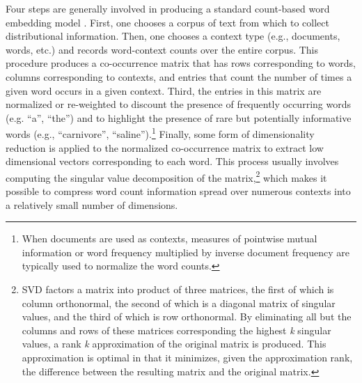 Four steps are generally involved in producing a standard count-based word embedding model \citep{TurneyPantel:2010,LandauerDumais:1997,Baroni:2014}. First, one chooses a corpus of text from which to collect distributional information. Then, one chooses a context type (e.g., documents, words, etc.) and records word-context counts over the entire corpus. This procedure produces a co-occurrence matrix that has rows corresponding to words, columns corresponding to contexts, and entries that count the number of times a given word occurs in a given context. Third, the entries in this matrix are normalized or re-weighted to discount the presence of frequently occurring words (e.g. ``a'', ``the'') and to highlight the presence of rare but potentially informative words (e.g., ``carnivore'', ``saline'').\footnote{When documents are used as contexts, measures of pointwise mutual information or word frequency multiplied by inverse document frequency are typically used to normalize the word counts.} Finally, some form of dimensionality reduction is applied to the normalized co-occurrence matrix to extract low dimensional vectors corresponding to each word. This process usually involves computing the singular value decomposition of the matrix,\footnote{SVD factors a matrix into product of three matrices, the first of which is column orthonormal, the second of which is a diagonal matrix of singular values, and the third of which is row orthonormal. By eliminating all but the columns and rows of these matrices corresponding the highest \textit{k} singular values, a rank \textit{k} approximation of the original matrix is produced. This approximation is optimal in that it minimizes, given the approximation rank, the difference between the resulting matrix and the original matrix.} which makes it possible to compress word count information spread over numerous contexts into a relatively small number of dimensions.

